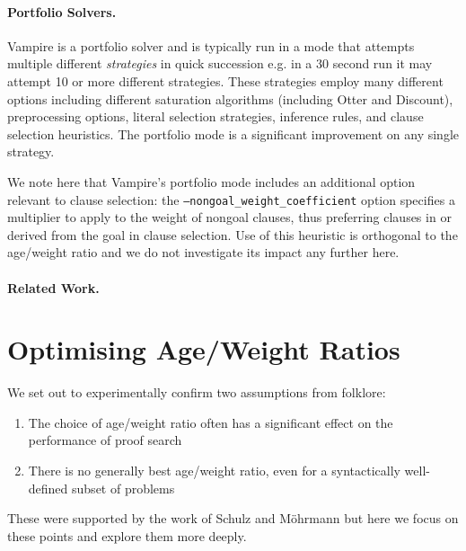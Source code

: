 \documentclass{llncs}
\newcommand{\sandm}{Schulz and M{\"{o}}hrmann}
\begin{document}
\paragraph{Portfolio Solvers.}

Vampire is a portfolio solver and is typically run in a mode that attempts multiple different \emph{strategies} in quick succession e.g. in a 30 second run it may attempt 10 or more different strategies. These strategies employ many different options including different saturation algorithms (including Otter and Discount), preprocessing options, literal selection strategies, inference rules, and clause selection heuristics. The portfolio mode is a significant improvement on any single strategy. 

We note here that Vampire's portfolio mode includes an additional option relevant to clause selection: the \texttt{--nongoal\_weight\_coefficient} option specifies a multiplier to apply to the weight of nongoal clauses, thus preferring clauses in or derived from the goal in clause selection. Use of this heuristic is orthogonal to the age/weight ratio and we do not investigate its impact any further here.

\paragraph{Related Work.} 

\newpage
\section{Optimising Age/Weight Ratios} \label{sec:awr:study}

We set out to experimentally confirm two assumptions from folklore:
\begin{enumerate}
	\item The choice of age/weight ratio often has a significant effect on the performance of proof search
	\item There is no generally best age/weight ratio, even for a syntactically well-defined subset of problems
\end{enumerate}
These were supported by the work of \sandm{} but here we focus on these points and explore them more deeply.
\end{document}

